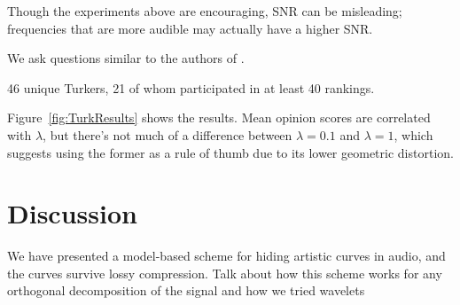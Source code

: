 \documentclass[runningheads]{llncs}
\begin{document}
Though the experiments above are encouraging, SNR can be misleading; frequencies that are more audible may actually have a higher SNR.

We ask questions similar to the authors of \cite{bassia2001robust}.

46 unique Turkers, 21 of whom participated in at least 40 rankings.

Figure~\ref{fig:TurkResults} shows the results.  Mean opinion scores are correlated with $\lambda$, but there's not much of a difference between $\lambda=0.1$ and $\lambda=1$, which suggests using the former as a rule of thumb due to its lower geometric distortion.

\section{Discussion}

We have presented a model-based scheme for hiding artistic curves in audio, and the curves survive lossy compression.  Talk about how this scheme works for any orthogonal decomposition of the signal and how we tried wavelets

%
%
%


%
\end{document}
